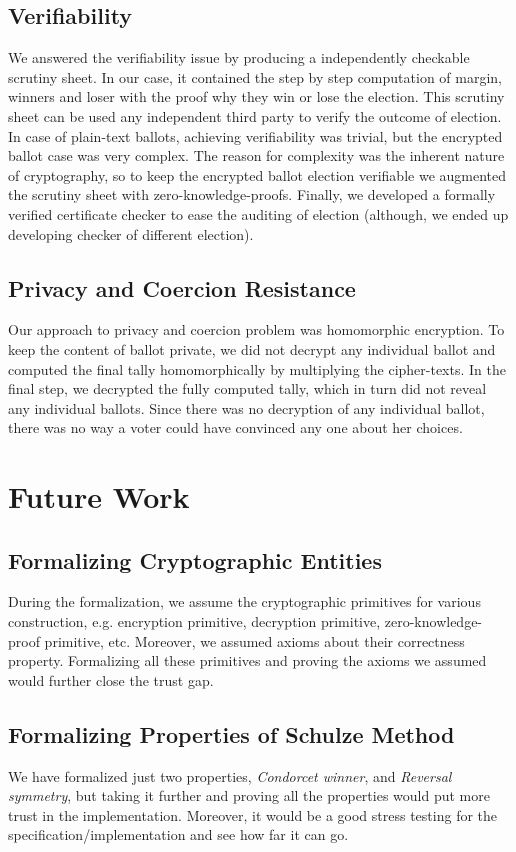 \subsection{Verifiability}
We answered the verifiability issue by producing a 
independently checkable scrutiny sheet. In our case, 
it contained the step by step computation of margin, 
winners and loser with the proof why they win or 
lose the election. This scrutiny 
sheet can be used any independent third party to verify the 
outcome of election. In case of plain-text ballots, 
achieving verifiability was trivial, but the encrypted 
ballot case was very complex. The reason 
for complexity was the inherent nature of cryptography, 
so to keep the encrypted ballot election verifiable 
we augmented the scrutiny sheet with zero-knowledge-proofs. 
Finally, we developed a formally verified certificate checker to ease the 
auditing of election (although, we ended up developing 
checker of different election). 

\subsection{Privacy and Coercion Resistance}
Our approach to privacy and coercion problem was homomorphic encryption. 
To keep the content of ballot private, we did not decrypt
any individual ballot and computed the final tally homomorphically 
by multiplying the cipher-texts. In the final step, we decrypted 
the fully computed tally, which 
in turn did not reveal any individual ballots.  Since there 
was no decryption of any individual ballot, there was 
no way a voter could have convinced any one about her 
choices. 


\section{Future Work}
\label{sec:future}
\subsection{Formalizing Cryptographic Entities}
During the formalization, we assume the cryptographic primitives 
for various construction, e.g. encryption primitive, decryption primitive,
zero-knowledge-proof primitive, etc. Moreover,  
we assumed axioms about their correctness property. 
Formalizing all these primitives and proving the 
axioms we assumed would further close the trust 
gap.  


\subsection{Formalizing Properties of Schulze Method}
We have formalized just two properties, 
\textit{Condorcet winner}, and \textit{Reversal symmetry},
but taking it further and proving all the properties 
would put more trust in the implementation. Moreover, 
it would be a good stress testing for the specification/implementation 
and see how far it can go. 

